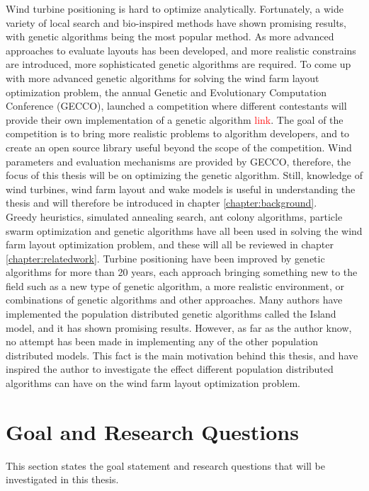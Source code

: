 \noindent Wind turbine positioning is hard to optimize analytically. Fortunately, a wide variety of local search and bio-inspired methods have shown promising results, with genetic algorithms being the most popular method. As more advanced approaches to evaluate layouts has been developed, and more realistic constrains are introduced, more sophisticated genetic algorithms are required. To come up with more advanced genetic algorithms for solving the wind farm layout optimization problem, the annual Genetic and Evolutionary Computation Conference (GECCO), launched a competition where different contestants will provide their own implementation of a genetic algorithm \textcolor{red}{link}. The goal of the competition is to bring more realistic problems to algorithm developers, and to create an open source library useful beyond the scope of the competition. Wind parameters and evaluation mechanisms are provided by GECCO, therefore, the focus of this thesis will be on optimizing the genetic algorithm. Still, knowledge of wind turbines, wind farm layout and wake models is useful in understanding the thesis and will therefore be introduced in chapter \ref{chapter:background}. \\

\noindent Greedy heuristics, simulated annealing search, ant colony algorithms, particle swarm optimization and genetic algorithms have all been used in solving the wind farm layout optimization problem, and these will all be reviewed in chapter \ref{chapter:relatedwork}. Turbine positioning have been improved by genetic algorithms for more than 20 years, each approach bringing something new to the field such as a new type of genetic algorithm, a more realistic environment, or combinations of genetic algorithms and other approaches. Many authors have implemented the population distributed genetic algorithms called the Island model, and it has shown promising results. However, as far as the author know, no attempt has been made in implementing any of the other population distributed models. This fact is the main motivation behind this thesis, and have inspired the author to investigate the effect different population distributed algorithms can have on the wind farm layout optimization problem. 


\section{Goal and Research Questions}\label{section:goal&researchquestions}
This section states the goal statement and research questions that will be investigated in this thesis. \\

